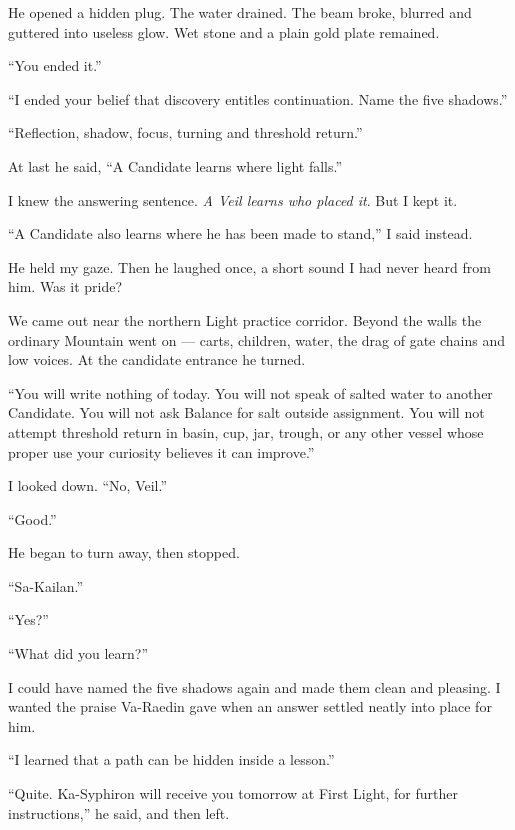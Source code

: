He opened a hidden plug. The water drained. The beam broke, blurred and guttered into useless glow. Wet stone and a plain gold plate remained.\par

``You ended it.'' \par
``I ended your belief that discovery entitles continuation. Name the five shadows.''\par
``Reflection, shadow, focus, turning and threshold return.''\par
At last he said, ``A Candidate learns where light falls.''\par
I knew the answering sentence. \textit{A Veil learns who placed it}. But I kept it. \par
``A Candidate also learns where he has been made to stand,'' I said instead.\par

He held my gaze. Then he laughed once, a short sound I had never heard from him. Was it pride?\par

\ornament

We came out near the northern Light practice corridor. Beyond the walls the ordinary Mountain went on --- carts, children, water, the drag of gate chains and low voices. At the candidate entrance he turned. \par

``You will write nothing of today. You will not speak of salted water to another Candidate. You will not ask Balance for salt outside assignment. You will not attempt threshold return in basin, cup, jar, trough, or any other vessel whose proper use your curiosity believes it can improve.''\par

I looked down. ``No, Veil.''\par
``Good.'' \par

He began to turn away, then stopped. \par
``Sa-Kailan.''\par
``Yes?''\par
``What did you learn?''\par

I could have named the five shadows again and made them clean and pleasing. I wanted the praise Va-Raedin gave when an answer settled neatly into place for him.\par
``I learned that a path can be hidden inside a lesson.''\par
``Quite. Ka-Syphiron will receive you tomorrow at First Light, for further instructions,'' he said, and then left.\par

